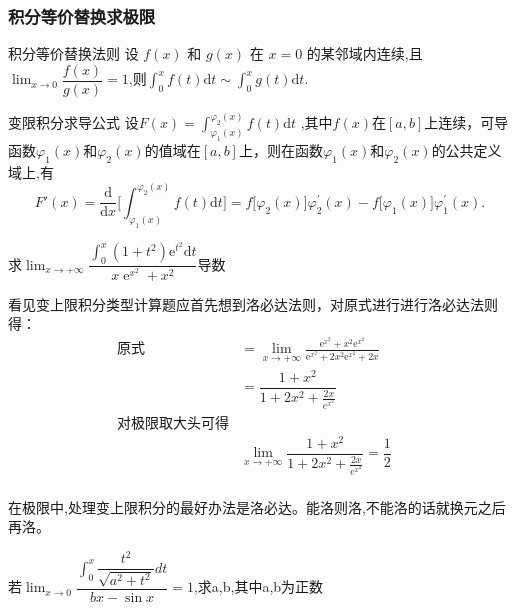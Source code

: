 \documentclass[10pt, a4paper, oneside, UTF8]{ctexbook}
\begin{document}
\begin{sloppypar}
    \subsubsection{积分等价替换求极限}
    \begin{defn}{积分等价替换法则}{}
        设 $f(x)$ 和 $g(x)$ 在 $x=0$ 的某邻域内连续,且$\operatorname*{lim}_{x\rightarrow0}\dfrac{f(x)}{g(x)}=1$,则$\int_{0}^{x}f(t)\mathrm{d}t\sim\int_{0}^{x}g(t)\mathrm{d}t.$ \label{BSXJF1}
    \end{defn}
    \begin{defn}{变限积分求导公式}{}
        设$F( x) = \int _{\varphi_1( x) }^{\varphi_2( x) }f( t) $d$t$ ,其中$f(x)$在$[a,b]$上连续，可导函数$\varphi_1(x)$和$\varphi_2(x)$的值域在$[a,b]$上，则在函数$\varphi_1(x)$和$\varphi_2(x)$的公共定义域上,有
        $$
        F'(x)=\frac{\mathrm{d}}{\mathrm{d}x}\biggl[\int_{\varphi_{1}(x)}^{\varphi_{2}(x)}f(t)\mathrm{d}t\biggr]=f\bigl[\varphi_{2}(x)\bigr]\varphi_{2}^{\prime}(x)-f\bigl[\varphi_{1}(x)\bigr]\varphi_{1}^{\prime}(x).
        $$
    \end{defn}
    \begin{problem}
        求$\lim_{x\to+\infty}\dfrac{\int_0^x(1+t^2)\mathrm{e}^{t^2}\mathrm{d}t}{x\operatorname{e}^{x^2}+x^2}$导数
    \end{problem}
    \begin{solution}
        看见变上限积分类型计算题应首先想到洛必达法则，对原式进行进行洛必达法则得：
            \begin{align*}
                \text{原式} & =\lim_{x\to+\infty}\frac{\mathrm{e}^{x^2}+{x^2\mathrm{e}^{x^2}}}{\mathrm{e}^{x^2}+2x^2\mathrm{e}^{x^2}+2x}  & \\
                & =\dfrac{1+x^2}{1+2x^2+\frac{2x}{e^{x^2}}} & \\
                \text{对极限取大头可得} & \\
                & \lim_{x\to +\infty} \dfrac{1+x^2}{1+2x^2+\frac{2x}{e^{x^2}}} = \dfrac{1}{2}  & \\
            \end{align*}
    \end{solution}
    \begin{note}
    在极限中,处理变上限积分的最好办法是洛必达。能洛则洛,不能洛的话就换元之后再洛。
    \end{note}
    \begin{problem}
        若$\operatorname*{lim}_{x \to 0}\dfrac{\int_{0}^{x}\dfrac{t^{2}}{\sqrt{a^{2}+t^{2}}}dt}{bx-\sin x}=1$,求a,b,其中a,b为正数
    \end{problem}

\end{sloppypar}
\end{document}
